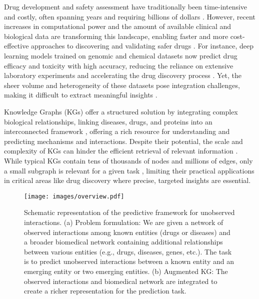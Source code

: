 Drug development and safety assessment have traditionally been time-intensive and costly, often spanning years and requiring billions of dollars \cite{paul2010improve, dimasi2003price}. 
However, recent increases in computational power and the amount of available clinical and biological data are transforming this landscape, enabling faster and more cost-effective approaches to discovering and validating safer drugs \cite{vamathevan2019applications, huang2024foundation, chandak2023building}.
For instance, deep learning models trained on genomic and chemical datasets now predict drug efficacy and toxicity with high accuracy, reducing the reliance on extensive laboratory experiments and accelerating the drug discovery process \cite{chaves2024txllm}. 
Yet, the sheer volume and heterogeneity of these datasets pose integration challenges, making it difficult to extract meaningful insights \cite{gligorijevic2015methods, davidson1995challenges}.

Knowledge Graphs (KGs) offer a structured solution by integrating complex biological relationships, linking diseases, drugs, and proteins into an interconnected framework \cite{hetionet2017, kuhn2007stitch, chandak2023building}, offering a rich resource for understanding and predicting mechanisms and interactions. 
Despite their potential, the scale and complexity of KGs can hinder the efficient retrieval of relevant information \cite{peng2023knowledge}.
While typical KGs contain tens of thousands of nodes and millions of edges, only a small subgraph is relevant for a given task \cite{yu2021sumgnn}, limiting their practical applications in critical areas like drug discovery where precise, targeted insights are essential.

\begin{figure}[t]
    \centering
    \texttt{[image: images/overview.pdf]} 
    \caption{Schematic representation of the predictive framework for unobserved interactions. (a) Problem formulation: We are given a network of observed interactions among known entities (drugs or diseases) and a broader biomedical network containing additional relationships between various entities (e.g., drugs, diseases, genes, etc.). The task is to predict unobserved interactions between a known entity and an emerging entity or two emerging entities. (b) Augmented KG: The observed interactions and biomedical network are integrated to create a richer representation for the prediction task.}
    \label{fig:overview}
\end{figure}


